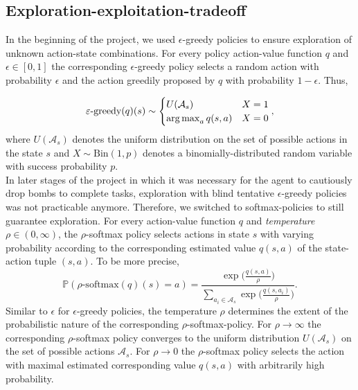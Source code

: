 \subsection{Exploration-exploitation-tradeoff}
In the beginning of the project, we used $\epsilon$-greedy policies to ensure exploration of unknown action-state combinations. For every policy action-value function $q$ and $\epsilon \in [0, 1]$ the corresponding $\epsilon$-greedy policy selects a random action with probability $\epsilon$ and the action greedily proposed by $q$ with probability $1-\epsilon$. Thus, 

\begin{equation} \label{epsilon-greedy-policy}
	\varepsilon\text{-greedy}(q)(s) \sim
\begin{cases}
 	U(\mathcal{A}_s) & X = 1\\
 	\operatorname*{arg\,max}_{a} q(s, a) & X = 0
\end{cases},
\end{equation}
where $U(\mathcal{A}_s)$ denotes the uniform distribution on the set of possible actions in the state $s$ and $X \sim \text{Bin}(1, p)$ denotes a binomially-distributed random variable with success probability $p$. \\

In later stages of the project in which it was necessary for the agent to cautiously drop bombs to complete tasks, exploration with blind tentative $\epsilon$-greedy policies was not practicable anymore. Therefore, we switched to softmax-policies to still guarantee exploration. For every action-value function $q$ and \emph{temperature} $\rho \in (0, \infty)$, the $\rho$-softmax policy selects actions in state $s$ with varying probability according to the corresponding estimated value $q(s, a)$ of the state-action tuple $(s, a)$. To be more precise, 
\begin{equation*}
	\mathbb{P}(\rho\text{-softmax}(q)(s) = a) = \frac{\exp\Big(\frac{q(s, a)}{\rho}\Big)}{\sum_{a_i \in \mathcal{A}_s} \exp\Big(\frac{q(s, a_i)}{\rho}\Big)}.
\end{equation*}
Similar to $\epsilon$ for $\epsilon$-greedy policies, the temperature $\rho$ determines the extent of the probabilistic nature of the corresponding $\rho$-softmax-policy. For $\rho \rightarrow \infty$ the corresponding $\rho$-softmax policy converges to the uniform distribution $U(\mathcal{A}_s)$ on the set of possible actions $\mathcal{A}_s$. For $\rho \rightarrow 0$ the $\rho$-softmax policy selects the action with maximal estimated corresponding value $q(s, a)$ with arbitrarily high probability. \\

